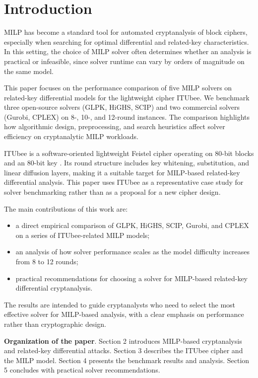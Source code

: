 \section{Introduction}
MILP has become a standard tool for automated cryptanalysis of block ciphers, especially when searching for optimal differential and related-key characteristics. In this setting, the choice of MILP solver often determines whether an analysis is practical or infeasible, since solver runtime can vary by orders of magnitude on the same model.

This paper focuses on the performance comparison of five MILP solvers on related-key differential models for the lightweight cipher ITUbee. We benchmark three open-source solvers (GLPK, HiGHS, SCIP) and two commercial solvers (Gurobi, CPLEX) on 8-, 10-, and 12-round instances. The comparison highlights how algorithmic design, preprocessing, and search heuristics affect solver efficiency on cryptanalytic MILP workloads.

ITUbee is a software-oriented lightweight Feistel cipher operating on 80-bit blocks and an 80-bit key \cite{karakoc2013itubee}. Its round structure includes key whitening, substitution, and linear diffusion layers, making it a suitable target for MILP-based related-key differential analysis. This paper uses ITUbee as a representative case study for solver benchmarking rather than as a proposal for a new cipher design.

The main contributions of this work are:
\begin{itemize}
    \item a direct empirical comparison of GLPK, HiGHS, SCIP, Gurobi, and CPLEX on a series of ITUbee-related MILP models;
    \item an analysis of how solver performance scales as the model difficulty increases from 8 to 12 rounds;
    \item practical recommendations for choosing a solver for MILP-based related-key differential cryptanalysis.
\end{itemize}

The results are intended to guide cryptanalysts who need to select the most effective solver for MILP-based analysis, with a clear emphasis on performance rather than cryptographic design.

\textbf{Organization of the paper}. Section 2 introduces MILP-based cryptanalysis and related-key differential attacks. Section 3 describes the ITUbee cipher and the MILP model. Section 4 presents the benchmark results and analysis. Section 5 concludes with practical solver recommendations.
